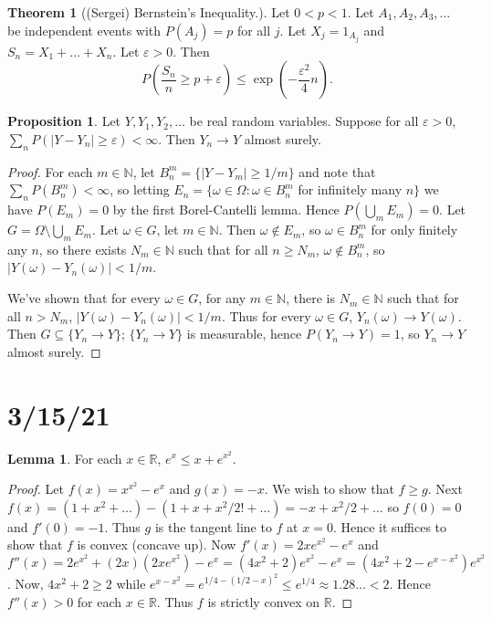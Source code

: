 \documentclass{article}
\newcommand{\R}{\mathbb{R}}
\newcommand{\N}{\mathbb{N}}
\theoremstyle{definition}
\newtheorem{lemma}[theorem]{Lemma}
\newtheorem{proposition}[theorem]{Proposition}
\newtheorem*{theorem*}{Theorem}
\begin{document}
\begin{theorem*}[(Sergei) Bernstein's Inequality.]
    Let $0 < p < 1$. Let $A_1, A_2, A_3, \dots$ be independent events with $P(A_j) = p$ for all $j$. Let $X_j = 1_{A_j}$ and $S_n = X_1 + \dots + X_n$. Let $\varepsilon > 0$. Then
    \[
        P\left(\frac{S_n}{n} \geq p+\varepsilon\right) \leq \exp\left(-\frac{\varepsilon^2}{4}n\right).
    \]
\end{theorem*}

\begin{proposition}
    Let $Y, Y_1, Y_2, \dots$ be real random variables. Suppose for all $\varepsilon > 0$, $\sum_n P(|Y-Y_n| \geq \varepsilon) < \infty$.
    Then $Y_n \to Y$ almost surely.
\end{proposition}
\begin{proof}
    For each $m \in \N$, let $B_n^m= \{|Y-Y_m| \geq 1/m\}$ and note that $\sum_n P(B_n^m) < \infty$, so letting $E_n = \{ \omega \in \Omega : \omega \in B_n^m$ for infinitely many $n\}$ we have $P(E_m) = 0$ by the first Borel-Cantelli lemma. Hence $P\left(\bigcup_m E_m\right) = 0$. Let $G = \Omega \setminus \bigcup_m E_m$. Let $\omega \in G$, let $m \in \N$. Then $\omega \notin E_m$, so $\omega \in B_n^m$ for only finitely any $n$, so there exists $N_m \in \N$ such that for all $n \geq N_m$, $\omega \notin B_n^m$, so $|Y(\omega)-Y_n(\omega)| < 1/m$.
    
    We've shown that for every $\omega \in G$, for any $m \in \N$, there is $N_m \in \N$ such that for all $n > N_m$, $|Y(\omega)-Y_n(\omega)| < 1/m$. Thus for every $\omega \in G$, $Y_n(\omega) \to Y(\omega)$. Then $G \subseteq \{Y_n \to Y\}$; $\{Y_n \to Y\}$ is measurable, hence $P(Y_n \to Y) = 1$, so $Y_n \to Y$ almost surely.
\end{proof}

\section*{3/15/21}

\begin{lemma}
    For each $x \in \R$, $e^x \leq x+e^{x^2}$.
\end{lemma}
\begin{proof}
    Let $f(x) = x^{x^2} - e^x$ and $g(x) = -x$. We wish to show that $f \geq g$. Next $f(x) = (1+x^2+\dots) - (1+x+x^2/2!+\dots) = -x + x^2/2 + \dots$ so $f(0) = 0$ and $f'(0) = -1$. Thus $g$ is the tangent line to $f$ at $x = 0$. Hence it suffices to show that $f$ is convex (concave up). Now $f'(x) = 2xe^{x^2} - e^x$ and $f''(x) = 2e^{x^2} + (2x)(2xe^{x^2})-e^x = (4x^2+2)e^{x^2}-e^x = (4x^2 + 2 - e^{x-x^2})e^{x^2}$.
    Now, $4x^2+2 \geq 2$ while $e^{x-x^2} = e^{1/4 - (1/2-x)^2} \leq e^{1/4} \approx 1.28\dots < 2$. Hence $f''(x) > 0$ for each $x \in \R$. Thus $f$ is strictly convex on $\R$.
\end{proof}
\end{document}
